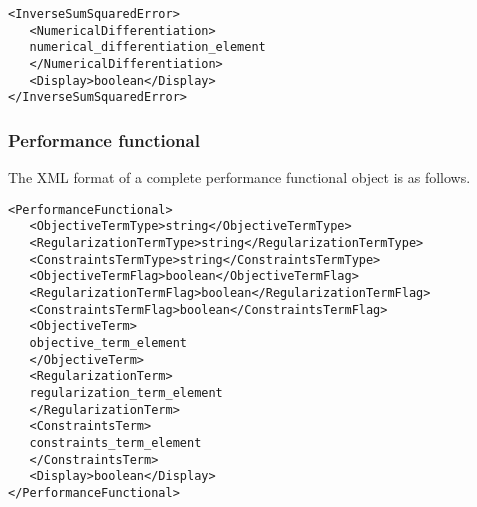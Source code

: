 \begin{lstlisting}
<InverseSumSquaredError>
   <NumericalDifferentiation>
   numerical_differentiation_element
   </NumericalDifferentiation>
   <Display>boolean</Display>
</InverseSumSquaredError>
\end{lstlisting}

\subsubsection{Performance functional}

The XML format of a complete performance functional object is as follows.

\begin{lstlisting}
<PerformanceFunctional>
   <ObjectiveTermType>string</ObjectiveTermType>
   <RegularizationTermType>string</RegularizationTermType>
   <ConstraintsTermType>string</ConstraintsTermType>
   <ObjectiveTermFlag>boolean</ObjectiveTermFlag>
   <RegularizationTermFlag>boolean</RegularizationTermFlag>
   <ConstraintsTermFlag>boolean</ConstraintsTermFlag>
   <ObjectiveTerm>   
   objective_term_element
   </ObjectiveTerm>   
   <RegularizationTerm>   
   regularization_term_element
   </RegularizationTerm>   
   <ConstraintsTerm>   
   constraints_term_element
   </ConstraintsTerm>   
   <Display>boolean</Display>
</PerformanceFunctional>
\end{lstlisting}

